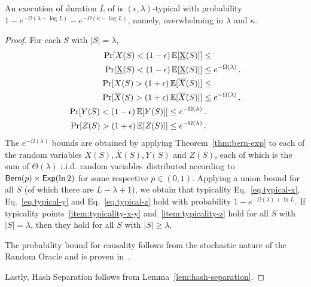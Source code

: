\begin{theorem}[Typicality]
  An execution of duration $L$ of \poem is $(\epsilon, \lambda)$-typical with
  probability $1 - e^{-\Omega(\lambda - \log L)} - e^{-\Omega(\kappa - \log L)}$,
  namely, overwhelming in $\lambda$ and $\kappa$.
\end{theorem}
\begin{proof}
  For each $S$ with $|S| = \lambda$,
  \begin{align*}
    \Pr[X(S) < (1 - \epsilon)\mathop{{}\mathbb{E}}[\underbar{X}(S)]] &\leq\\
    \Pr[\underbar{X}(S) < (1 - \epsilon)\mathop{{}\mathbb{E}}[\underbar{X}(S)]] &\leq
    e^{-\Omega(\lambda)} \,.\\
    \Pr[X(S) > (1 + \epsilon)\mathop{{}\mathbb{E}}[\overline{X}(S)]] &\leq\\
    \Pr[\overline{X}(S) > (1 + \epsilon)\mathop{{}\mathbb{E}}[\overline{X}(S)]] &\leq
    e^{-\Omega(\lambda)} \,.\\
    \Pr[Y(S) < (1 - \epsilon)\mathop{{}\mathbb{E}}[Y(S)]] \leq e^{-\Omega(\lambda)} &\,.\\
    \Pr[Z(S) > (1 + \epsilon)\mathop{{}\mathbb{E}}[Z(S)]] \leq e^{-\Omega(\lambda)} &\,.\\
  \end{align*}
  The $e^{-\Omega(\lambda)}$ bounds are obtained by applying
  Theorem~\ref{thm:bern-exp} to each of the random variables
  $\underbar{X}(S), \overline{X}(S), Y(S)$ and $Z(S)$, each
  of which is the sum of $\Theta(\lambda)$ i.i.d. random variables\
  distributed according to $\textsf{Bern}(p) \times \textsf{Exp}(\ln2)$ for
  some respective $p \in (0, 1)$.
  Applying a union bound for all $S$ (of which there are $L - \lambda + 1$),
  we obtain that typicality Eq.~\ref{eq.typical-x}, Eq.~\ref{eq.typical-y}
  and Eq.~\ref{eq.typical-z}
  hold with probability $1 - e^{-\Omega(\lambda)+\ln L}$.
  If typicality points~\ref{item:typicality-x-y} and~\ref{item:typicality-z}
  hold for all $S$ with $|S| = \lambda$, then they hold for all $S$ with
  $|S| \geq \lambda$.

  The probability bound for causality follows from the stochastic nature
  of the Random Oracle and is proven in~\cite{backbone}.

  Lastly, Hash Separation follows from Lemma~\ref{lem:hash-separation}.
  \Qed
\end{proof}

